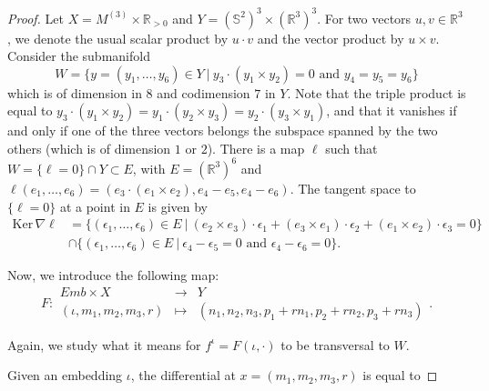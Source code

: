 \documentclass[11pt]{article}
\newcommand{\R}{\mathbb{R}}
\newcommand{\io}{\iota}
\newcommand{\eps}{\epsilon}
\newcommand{\inter}{\cap}
\newcommand{\grad}{\nabla}
\newcommand{\Ker}{\mathrm{Ker} \,}
\theoremstyle{plain}
\theoremstyle{definition}
\theoremstyle{remark}
\begin{document}
\begin{proof}
Let $X = M^{(3)} \times \R_{>0}$ and $Y = (\mathbb{S}^2)^3 \times (\R^3)^3$. For two vectors $u,v \in \R^3$, we denote the usual scalar product by $u \cdot v$ and the vector product by $u \times v$. Consider the submanifold 
\[ W = \{y = (y_1,\ldots, y_6)\in Y ~|~ y_3 \cdot (y_1 \times y_2) = 0 \text{ and } y_4 = y_5 = y_6 \} \]
which is of dimension in $8$ and codimension $7$ in $Y$.
Note that the triple product is equal to $y_3 \cdot (y_1 \times y_2) = y_1 \cdot (y_2 \times y_3) = y_2 \cdot (y_3 \times y_1)$, and that it vanishes if and only if one of the three vectors belongs the subspace spanned by the two others (which is of dimension $1$ or $2$). There is a map $\ell$ such that $W = \{\ell = 0\} \inter Y \subset E$, with $E = (\R^3)^6$ and
$\ell(e_1,\ldots, e_6) = (e_3 \cdot (e_1 \times e_2), e_4 - e_5, e_4 - e_6)$. The tangent space to $\{\ell = 0\}$ at a point in $E$ is given by 
\begin{align*}
\Ker \grad \ell & = \{ (\eps_1,\ldots, \eps_6) \in E ~|~ (e_2 \times e_3) \cdot \eps_1 + (e_3 \times e_1) \cdot \eps_2 + (e_1 \times e_2) \cdot \eps_3 = 0 \} \\ 
& \inter \{  (\eps_1,\ldots, \eps_6) \in E ~|~ \eps_4 - \eps_5 = 0 \text{ and } \eps_4 - \eps_6 = 0\}.
\end{align*}

Now, we introduce the following map:
\begin{equation}
	F:
	\begin{array}{ccc}
		Emb \times X & \to & Y \\
		(\io, m_1,m_2,m_3,r) & \mapsto & (n_1, n_2, n_3, p_1 + r n_1, p_2 + r n_2 , p_3 + r n_3)
	\end{array}.
\end{equation}

Again, we study what it means for $f^\io = F(\io,\cdot)$ to be transversal to $W$.

Given an embedding $\io$, the differential at $x = (m_1,m_2,m_3,r)$ is equal to


\end{proof}
\end{document}
